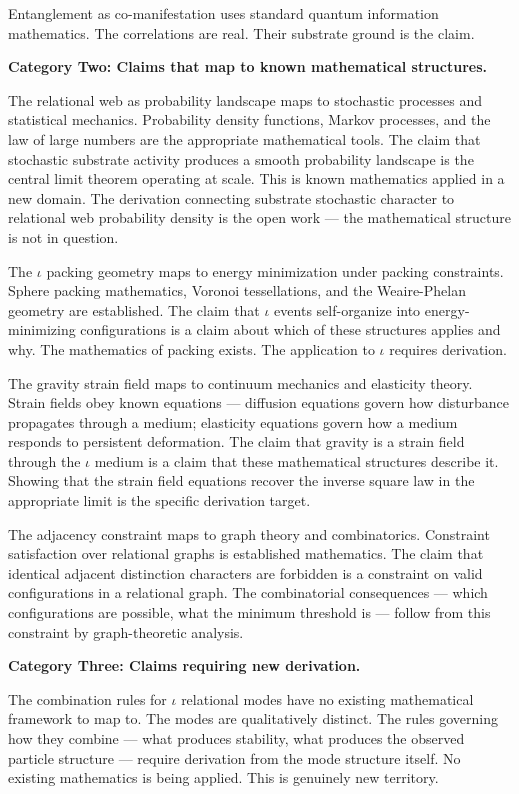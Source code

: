 \documentclass[11pt,letterpaper]{article}
\begin{document}
Entanglement as co-manifestation uses standard quantum information mathematics. The correlations are real. Their substrate ground is the claim.

\textbf{Category Two: Claims that map to known mathematical structures.}

The relational web as probability landscape maps to stochastic processes and statistical mechanics. Probability density functions, Markov processes, and the law of large numbers are the appropriate mathematical tools. The claim that stochastic substrate activity produces a smooth probability landscape is the central limit theorem operating at scale. This is known mathematics applied in a new domain. The derivation connecting substrate stochastic character to relational web probability density is the open work --- the mathematical structure is not in question.

The \(\iota\) packing geometry maps to energy minimization under packing constraints. Sphere packing mathematics, Voronoi tessellations, and the Weaire-Phelan geometry are established. The claim that \(\iota\) events self-organize into energy-minimizing configurations is a claim about which of these structures applies and why. The mathematics of packing exists. The application to \(\iota\) requires derivation.

The gravity strain field maps to continuum mechanics and elasticity theory. Strain fields obey known equations --- diffusion equations govern how disturbance propagates through a medium; elasticity equations govern how a medium responds to persistent deformation. The claim that gravity is a strain field through the \(\iota\) medium is a claim that these mathematical structures describe it. Showing that the strain field equations recover the inverse square law in the appropriate limit is the specific derivation target.

The adjacency constraint maps to graph theory and combinatorics. Constraint satisfaction over relational graphs is established mathematics. The claim that identical adjacent distinction characters are forbidden is a constraint on valid configurations in a relational graph. The combinatorial consequences --- which configurations are possible, what the minimum threshold is --- follow from this constraint by graph-theoretic analysis.

\textbf{Category Three: Claims requiring new derivation.}

The combination rules for \(\iota\) relational modes have no existing mathematical framework to map to. The modes are qualitatively distinct. The rules governing how they combine --- what produces stability, what produces the observed particle structure --- require derivation from the mode structure itself. No existing mathematics is being applied. This is genuinely new territory.
\end{document}
